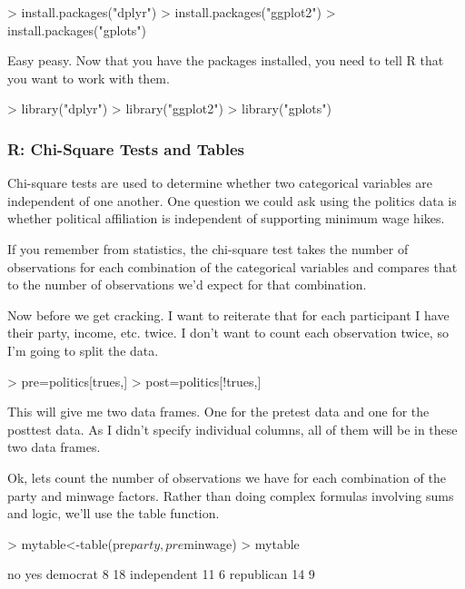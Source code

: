 \documentclass[12pt]{article}
\begin{document}
\begin{Schunk}
\begin{Sinput}
> install.packages("dplyr")
> install.packages("ggplot2")
> install.packages("gplots")
\end{Sinput}
\end{Schunk}

Easy peasy. Now that you have the packages installed, you need to tell R that
you want to work with them.

\begin{Schunk}
\begin{Sinput}
> library("dplyr")
> library("ggplot2")
> library("gplots")
\end{Sinput}
\end{Schunk}

\subsubsection{R: Chi-Square Tests and Tables}
Chi-square tests are used to determine whether two categorical variables
are independent of one another. One question we could ask using the politics
data is whether political affiliation is independent of supporting minimum
wage hikes.

If you remember from statistics, the chi-square test takes the number of
observations for each combination of the categorical variables and compares
that to the number of observations we'd expect for that combination.

Now before we get cracking. I want to reiterate that for each participant I
have their party, income, etc. twice. I don't want to count each observation
twice, so I'm going to split the data.

\begin{Schunk}
\begin{Sinput}
> pre=politics[trues,]
> post=politics[!trues,]
\end{Sinput}
\end{Schunk}

This will give me two data frames. One for the pretest data and one for the
posttest data. As I didn't specify individual columns, all of them will be
in these two data frames.

Ok, lets count the number of observations we have for each combination of the
party and minwage factors. Rather than doing complex formulas involving sums and
logic, we'll use the table function.

\begin{Schunk}
\begin{Sinput}
> mytable<-table(pre$party,pre$minwage)
> mytable
\end{Sinput}
\begin{Soutput}
              no yes
  democrat     8  18
  independent 11   6
  republican  14   9
\end{Soutput}
\end{Schunk}
\end{document}
